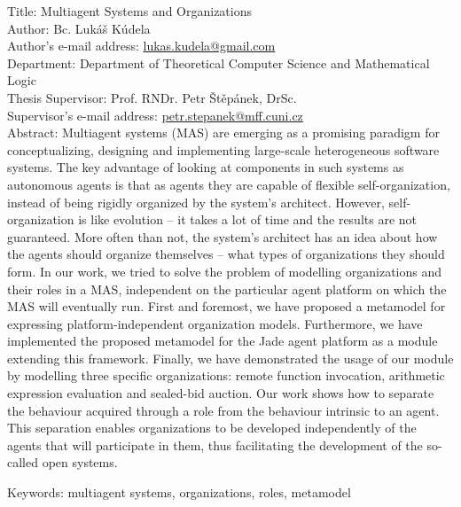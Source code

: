 
Title: Multiagent Systems and Organizations\\
Author: Bc. Lukáš Kúdela\\
Author's e-mail address: \url{lukas.kudela@gmail.com}\\
Department: Department of Theoretical Computer Science and Mathematical Logic\\
Thesis Supervisor: Prof. RNDr. Petr Štěpánek, DrSc.\\
Supervisor's e-mail address: \url{petr.stepanek@mff.cuni.cz}\\

Abstract: Multiagent systems (MAS) are emerging as a promising paradigm for conceptualizing, designing and implementing large-scale heterogeneous software systems.
The key advantage of looking at components in such systems as autonomous agents is that as agents they are capable of flexible self-organization, instead of being rigidly organized by the system's architect.
However, self-organization is like evolution -- it takes a lot of time and the results are not guaranteed.
More often than not, the system's architect has an idea about how the agents should organize themselves -- what types of organizations they should form.
In our work, we tried to solve the problem of modelling organizations and their roles in a MAS, independent on the particular agent platform on which the MAS will eventually run.
First and foremost, we have proposed a metamodel for expressing platform-independent organization models.
Furthermore, we have implemented the proposed metamodel for the Jade agent platform as a module extending this framework.
Finally, we have demonstrated the usage of our module by modelling three specific organizations: remote function invocation, arithmetic expression evaluation and sealed-bid auction.
Our work shows how to separate the behaviour acquired through a role from the behaviour intrinsic to an agent. 
This separation enables organizations to be developed independently of the agents that will participate in them, thus facilitating the development of the so-called open systems.

Keywords: multiagent systems, organizations, roles, metamodel